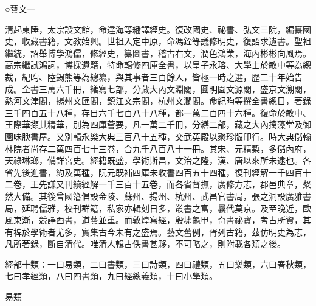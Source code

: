 
\begin{pinyinscope}
○藝文一

清起東陲，太宗設文館，命達海等繙譯經史。復改國史、祕書、弘文三院，編纂國史，收藏書籍，文教始興。世祖入定中原，命馮銓等議修明史，復詔求遺書。聖祖繼統，詔舉博學鴻儒，修經史，纂圖書，稽古右文，潤色鴻業，海內彬彬向風焉。高宗繼試鴻詞，博採遺籍，特命輯修四庫全書，以皇子永瑢、大學士於敏中等為總裁，紀昀、陸錫熊等為總纂，與其事者三百餘人，皆極一時之選，歷二十年始告成。全書三萬六千冊，繕寫七部，分藏大內文淵閣，圓明園文源閣，盛京文溯閣，熱河文津閣，揚州文匯閣，鎮江文宗閣，杭州文瀾閣。命紀昀等撰全書總目，著錄三千四百五十八種，存目六千七百八十八種，都一萬二百四十六種。復命於敏中、王際華擷其精華，別為四庫薈要，凡一萬二千冊，分繕二部，藏之大內摛藻堂及御園味腴書屋。又別輯永樂大典三百八十五種，交武英殿以聚珍版印行。時大典儲翰林院者尚存二萬四百七十三卷，合九千八百八十一冊。其宋、元精槧，多儲內府，天祿琳瑯，備詳宮史。經籍既盛，學術斯昌，文治之隆，漢、唐以來所未逮也。各省先後進書，約及萬種，阮元既補四庫未收書四百五十四種，復刊經解一千四百十二卷，王先謙又刊續經解一千三百十五卷，而各省督撫，廣修方志，郡邑典章，粲然大備。其後曾國籓倡設金陵、蘇州、揚州、杭州、武昌官書局，張之洞設廣雅書局，延聘儒雅，校刊群籍，私家亦輯刻日多，叢書之富，曩代莫京。及至晚近，歐風東漸，競譯西書，道藝並重。而敦煌寫經，殷墟龜甲，奇書祕寶，考古所資，其有裨於學術者尤多，實集古今未有之盛焉。藝文舊例，胥列古籍，茲仿明史為志，凡所著錄，斷自清代。唯清人輯古佚書甚夥，不可略之，則附載各類之後。

經部十類：一曰易類，二曰書類，三曰詩類，四曰禮類，五曰樂類，六曰春秋類，七曰孝經類，八曰四書類，九曰經總義類，十曰小學類。

易類


\end{pinyinscope}
